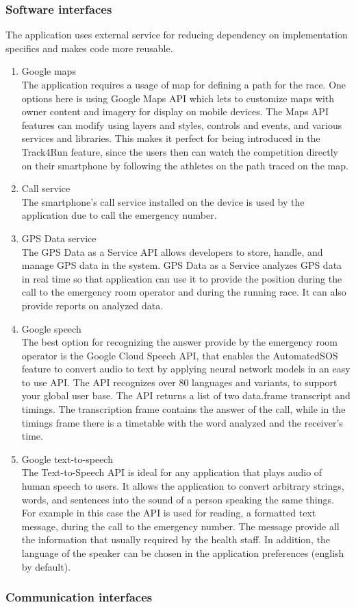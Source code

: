 \subsubsection{Software interfaces}
The application uses external service for reducing dependency on implementation specifics and makes code more reusable.
\begin{enumerate}
\item Google maps\\
The application requires a usage of map for defining a path for the race. One options here is using Google Maps API which lets to customize maps with owner content and imagery for display on mobile devices. The Maps API features can modify using layers and styles, controls and events, and various services and libraries. This makes it perfect for being introduced in the Track4Run feature, since the users then can watch the competition directly on their smartphone by following the athletes on the path traced on the map. 
\item Call service\\
The smartphone's call service installed on the device is used by the application due to call the emergency number.
\item GPS Data service\\
The GPS Data as a Service API allows developers to store, handle, and manage GPS data in the system. GPS Data as a Service analyzes GPS data in real time so that application can use it to provide the position during the call to the emergency room operator and during the running race. It can also provide reports on analyzed data. 
\item Google speech\\
The best option for recognizing the answer provide by the emergency room operator is the Google Cloud Speech API, that enables the AutomatedSOS feature to convert audio to text by applying neural network models in an easy to use API. The API recognizes over 80 languages and variants, to support your global user base. The API returns a list of two data.frame transcript and timings. The transcription frame contains the answer of the call, while in the timings frame there is a timetable with the word analyzed and the receiver's time. 
\item Google text-to-speech\\
The Text-to-Speech API is ideal for any application that plays audio of human speech to users. It allows the application to convert arbitrary strings, words, and sentences into the sound of a person speaking the same things. For example in this case the API is used for reading, a formatted text message, during the call to the emergency number. The message provide all the information that usually required by the health staff. In addition, the language of the speaker can be chosen in the application preferences (english by default).
\end{enumerate}
\subsubsection{Communication interfaces} 

